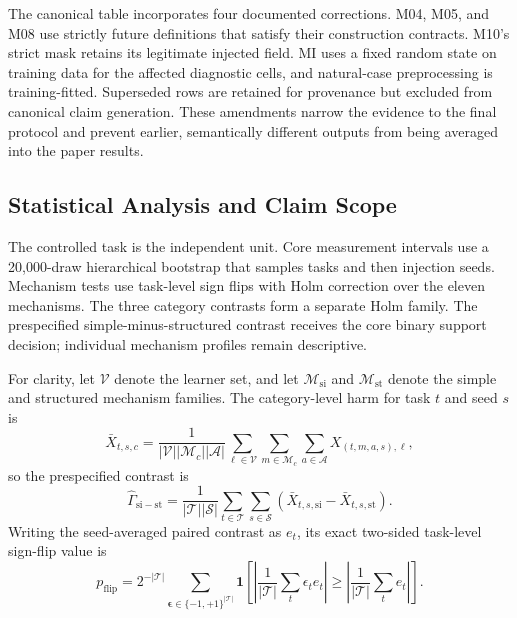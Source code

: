\documentclass[sigconf,review]{acmart}
\begin{document}
The canonical table incorporates four documented corrections. M04, M05, and
M08 use strictly future definitions that satisfy their construction contracts.
M10's strict mask retains its legitimate injected field. MI uses a fixed random
state on training data for the affected diagnostic cells, and natural-case
preprocessing is training-fitted. Superseded rows are
retained for provenance but excluded from canonical claim generation. These
amendments narrow the evidence to the final protocol and prevent earlier,
semantically different outputs from being averaged into the paper results.

\subsection{Statistical Analysis and Claim Scope}

The controlled task is the independent unit. Core measurement intervals use a
20,000-draw hierarchical bootstrap that samples tasks and then injection seeds.
Mechanism tests use task-level sign flips with Holm correction over the eleven
mechanisms. The three category contrasts form a separate Holm family. The
prespecified simple-minus-structured contrast receives the core binary support
decision; individual mechanism profiles remain descriptive.

For clarity, let $\mathcal{V}$ denote the learner set, and let
$\mathcal{M}_{\mathrm{si}}$ and $\mathcal{M}_{\mathrm{st}}$ denote the simple
and structured mechanism families. The category-level harm for task $t$ and
seed $s$ is
\begin{equation}
 \bar X_{t,s,c}=\frac{1}{|\mathcal{V}||\mathcal{M}_c||\mathcal{A}|}
 \sum_{\ell\in\mathcal{V}}\sum_{m\in\mathcal{M}_c}
 \sum_{a\in\mathcal{A}}X_{(t,m,a,s),\ell},
 \label{eq:category-harm}
\end{equation}
so the prespecified contrast is
\begin{equation}
 \widehat{\Gamma}_{\mathrm{si-st}}
 =\frac{1}{|\mathcal{T}||\mathcal{S}|}
 \sum_{t\in\mathcal{T}}\sum_{s\in\mathcal{S}}
 \left(\bar X_{t,s,\mathrm{si}}-\bar X_{t,s,\mathrm{st}}\right).
 \label{eq:core-contrast}
\end{equation}
Writing the seed-averaged paired contrast as $e_t$, its exact two-sided
task-level sign-flip value is
\begin{equation}
 p_{\mathrm{flip}}=2^{-|\mathcal{T}|}
 \sum_{\boldsymbol{\epsilon}\in\{-1,+1\}^{|\mathcal{T}|}}
 \mathbf{1}\!\left[
 \left|\frac{1}{|\mathcal{T}|}\sum_t\epsilon_t e_t\right|
 \geq\left|\frac{1}{|\mathcal{T}|}\sum_t e_t\right|\right].
 \label{eq:sign-flip}
\end{equation}
\end{document}

